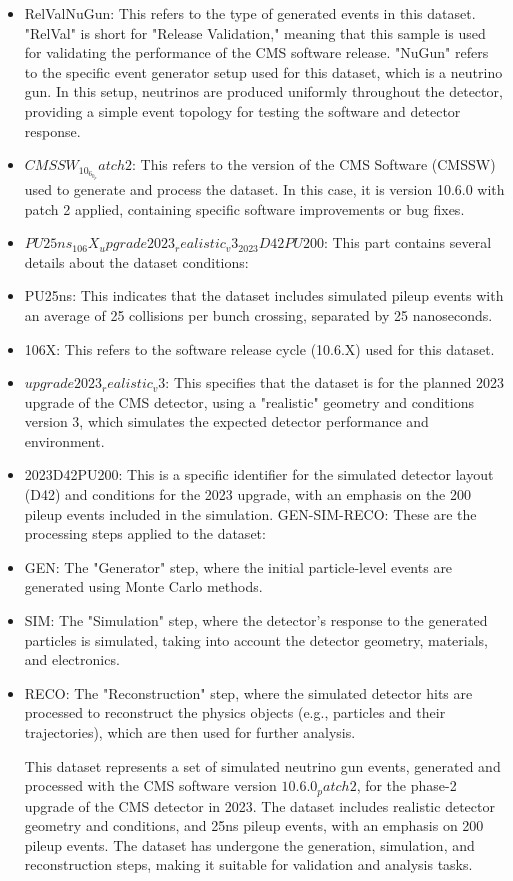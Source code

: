 \begin{itemize}

\item RelValNuGun: This refers to the type of generated events in this dataset. "RelVal" is short for "Release Validation," meaning that this sample is used for validating the performance of the CMS software release. "NuGun" refers to the specific event generator setup used for this dataset, which is a neutrino gun. In this setup, neutrinos are produced uniformly throughout the detector, providing a simple event topology for testing the software and detector response.

\item $CMSSW_10_6_0_patch2$: This refers to the version of the CMS Software (CMSSW) used to generate and process the dataset. In this case, it is version 10.6.0 with patch 2 applied, containing specific software improvements or bug fixes.

\item $PU25ns_106X_upgrade2023_realistic_v3_2023D42PU200$: This part contains several details about the dataset conditions:

\item PU25ns: This indicates that the dataset includes simulated pileup events with an average of 25 collisions per bunch crossing, separated by 25 nanoseconds.
\item 106X: This refers to the software release cycle (10.6.X) used for this dataset.
\item $upgrade2023_realistic_v3$: This specifies that the dataset is for the planned 2023 upgrade of the CMS detector, using a "realistic" geometry and conditions version 3, which simulates the expected detector performance and environment.
\item 2023D42PU200: This is a specific identifier for the simulated detector layout (D42) and conditions for the 2023 upgrade, with an emphasis on the 200 pileup events included in the simulation.
GEN-SIM-RECO: These are the processing steps applied to the dataset:

\item GEN: The "Generator" step, where the initial particle-level events are generated using Monte Carlo methods.
\item SIM: The "Simulation" step, where the detector's response to the generated particles is simulated, taking into account the detector geometry, materials, and electronics.
\item RECO: The "Reconstruction" step, where the simulated detector hits are processed to reconstruct the physics objects (e.g., particles and their trajectories), which are then used for further analysis.

This dataset represents a set of simulated neutrino gun events, generated and processed with the CMS software version $10.6.0_patch2$, for the phase-2 upgrade of the CMS detector in 2023. The dataset includes realistic detector geometry and conditions, and 25ns pileup events, with an emphasis on 200 pileup events. The dataset has undergone the generation, simulation, and reconstruction steps, making it suitable for validation and analysis tasks.

\end{itemize}


